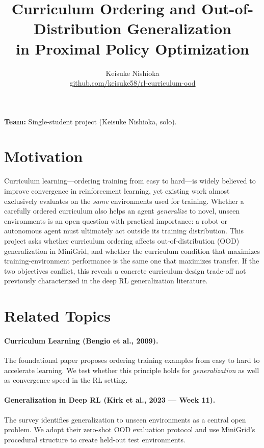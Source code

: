 \documentclass{article}
\title{Curriculum Ordering and Out-of-Distribution Generalization\\
in Proximal Policy Optimization}
\author{Keisuke Nishioka \\ \url{github.com/keisuke58/rl-curriculum-ood}}
\begin{document}
\maketitle

\noindent\textbf{Team:} Single-student project (Keisuke Nishioka, solo).

\section{Motivation}

Curriculum learning---ordering training from easy to hard---is widely believed to improve convergence in reinforcement learning, yet existing work almost exclusively evaluates on the \emph{same} environments used for training.
Whether a carefully ordered curriculum also helps an agent \emph{generalize} to novel, unseen environments is an open question with practical importance: a robot or autonomous agent must ultimately act outside its training distribution.
This project asks whether curriculum ordering affects out-of-distribution (OOD) generalization in MiniGrid, and whether the curriculum condition that maximizes training-environment performance is the same one that maximizes transfer.
If the two objectives conflict, this reveals a concrete curriculum-design trade-off not previously characterized in the deep RL generalization literature.

\section{Related Topics}

\paragraph{Curriculum Learning (Bengio et al., 2009).}
The foundational paper proposes ordering training examples from easy to hard to accelerate learning. We test whether this principle holds for \emph{generalization} as well as convergence speed in the RL setting.

\paragraph{Generalization in Deep RL (Kirk et al., 2023 --- Week 11).}
The survey identifies generalization to unseen environments as a central open problem. We adopt their zero-shot OOD evaluation protocol and use MiniGrid's procedural structure to create held-out test environments.
\end{document}
